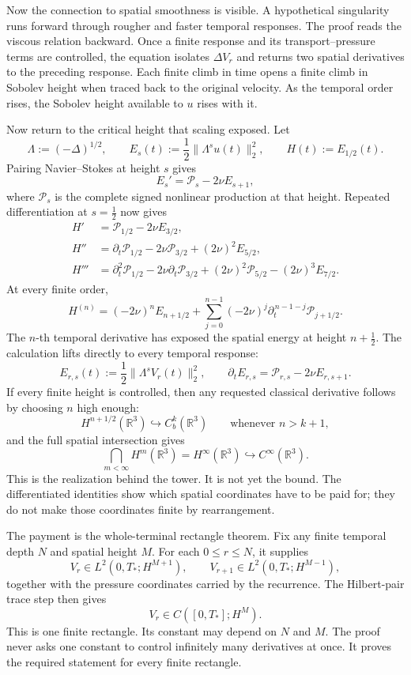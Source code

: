 Now the connection to spatial smoothness is visible.  A hypothetical
singularity runs forward through rougher and faster temporal responses.  The
proof reads the viscous relation backward.  Once a finite response and its
transport--pressure terms are controlled, the equation isolates
\(\Delta V_r\) and returns two spatial derivatives to the preceding response.
Each finite climb in time opens a finite climb in Sobolev height when traced
back to the original velocity.  As the temporal order rises, the Sobolev
height available to \(u\) rises with it.

Now return to the critical height that scaling exposed.  Let
\[
\Lambda:=(-\Delta)^{1/2},
\qquad
E_s(t):=\frac12\|\Lambda^su(t)\|_2^2,
\qquad
H(t):=E_{1/2}(t).
\]
Pairing Navier--Stokes at height \(s\) gives
\[
E_s'=\mathcal P_s-2\nu E_{s+1},
\]
where \(\mathcal P_s\) is the complete signed nonlinear production at that
height.  Repeated differentiation at \(s=\tfrac12\) now gives
\[
\begin{aligned}
H'
&=\mathcal P_{1/2}-2\nu E_{3/2},\\
H''
&=\partial_t\mathcal P_{1/2}
  -2\nu\mathcal P_{3/2}
  +(2\nu)^2E_{5/2},\\
H'''
&=\partial_t^2\mathcal P_{1/2}
  -2\nu\partial_t\mathcal P_{3/2}
  +(2\nu)^2\mathcal P_{5/2}
  -(2\nu)^3E_{7/2}.
\end{aligned}
\]
At every finite order,
\[
H^{(n)}
=(-2\nu)^nE_{n+1/2}
+\sum_{j=0}^{n-1}(-2\nu)^j
 \partial_t^{\,n-1-j}\mathcal P_{j+1/2}.
\]
The \(n\)-th temporal derivative has exposed the spatial energy at height
\(n+\tfrac12\).  The calculation lifts directly to every temporal response:
\[
E_{r,s}(t):=\frac12\|\Lambda^sV_r(t)\|_2^2,
\qquad
\partial_tE_{r,s}
=\mathcal P_{r,s}-2\nu E_{r,s+1}.
\]
If every finite height is controlled, then any requested classical derivative
follows by choosing \(n\) high enough:
\[
H^{n+1/2}(\mathbb R^3)\hookrightarrow C_b^k(\mathbb R^3)
\qquad\text{whenever }n>k+1,
\]
and the full spatial intersection gives
\[
\bigcap_{m<\infty}H^m(\mathbb R^3)
=H^\infty(\mathbb R^3)
\hookrightarrow C^\infty(\mathbb R^3).
\]
This is the realization behind the tower.  It is not yet the bound.  The
differentiated identities show which spatial coordinates have to be paid for;
they do not make those coordinates finite by rearrangement.

The payment is the whole-terminal rectangle theorem.  Fix any finite temporal
depth \(N\) and spatial height \(M\).  For each \(0\le r\le N\), it supplies
\[
V_r\in L^2(0,T_*;H^{M+1}),
\qquad
V_{r+1}\in L^2(0,T_*;H^{M-1}),
\]
together with the pressure coordinates carried by the recurrence.  The
Hilbert-pair trace step then gives
\[
V_r\in C([0,T_*];H^M).
\]
This is one finite rectangle.  Its constant may depend on \(N\) and \(M\).
The proof never asks one constant to control infinitely many derivatives at
once.  It proves the required statement for every finite rectangle.


